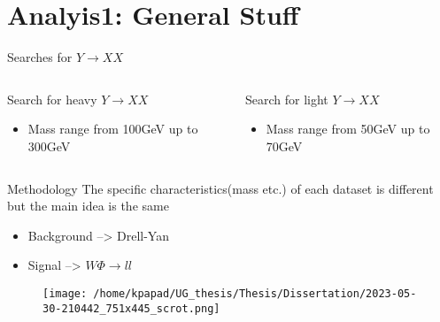 \documentclass[bigger]{beamer}
\begin{document}
\section{Analyis1: General Stuff}
\label{sec:orgd3bc825}
\begin{frame}[label={sec:org0f337df}]{Searches for \(Y \rightarrow XX\)}
\begin{columns}
\begin{column}{0.5\columnwidth}
Search for heavy \(Y \rightarrow XX\)
\begin{itemize}
\item Mass range from 100GeV up to 300GeV
\end{itemize}
\end{column}
\begin{column}{0.5\columnwidth}
Search for light \(Y \rightarrow XX\)
\begin{itemize}
\item Mass range from 50GeV up to 70GeV
\end{itemize}
\end{column}
\end{columns}
\end{frame}
\begin{frame}[label={sec:orgb6a3cdd}]{Methodology}
The specific characteristics(mass etc.) of each dataset  is different but the main idea is the same
\begin{itemize}
\item Background --> Drell-Yan
\item Signal --> \(W\Phi \rightarrow ll\)
\end{itemize}
\begin{figure}[hb]
\centering
\texttt{[image: /home/kpapad/UG\_thesis/Thesis/Dissertation/2023-05-30-210442\_751x445\_scrot.png]}
\end{figure}
\end{frame}
\end{document}
